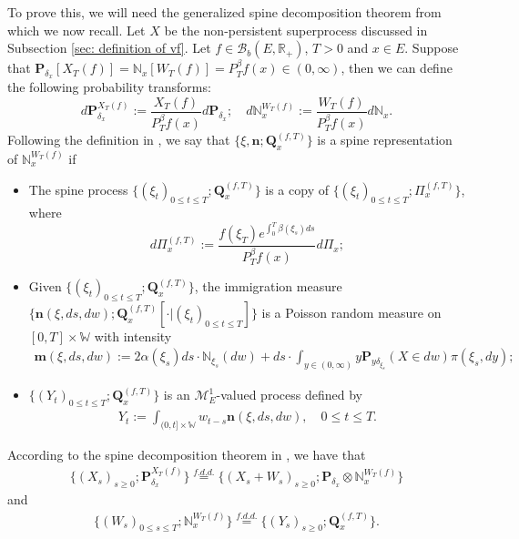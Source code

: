 \documentclass[12pt]{amsart}
\theoremstyle{plain}
\theoremstyle{definition}
\numberwithin{equation}{section}
\begin{document}
    To prove this, we will need the generalized spine decomposition theorem from \cite{RenSongSun2017Spine} which we now recall.
    Let $X$ be the non-persistent superprocess discussed in Subsection \ref{sec: definition of vf}.
    Let $f\in \mathcal B_b(E,\mathbb R_+)$, $T >0$ and $x\in E$.
    Suppose that $\mathbf P_{\delta_x}[X_T(f)] = \mathbb N_x[W_T(f)] = P^\beta_T f(x) \in (0,\infty)$, then we can define the following probability transforms:
\begin{equation}
    d\mathbf P_{\delta_x}^{X_T(f)}
    := \frac{X_T(f)}{P_T^\beta f(x)} d\mathbf P_{\delta_x};
    \quad d\mathbb N_x^{W_T(f)}
    :=  \frac{W_T(f)}{P_T^\beta f(x)} d\mathbb N_x.
\end{equation}
    Following the definition in \cite{RenSongSun2017Spine}, we say that $\{\xi, \mathbf n;\mathbf Q_{x}^{(f,T)}\}$ is a spine representation of $\mathbb N_x^{W_T(f)}$ if
\begin{itemize}
\item
    The spine process $\{(\xi_t)_{0\leq t\leq T}; \mathbf Q^{(f,T)}_x\}$ is a copy of $\{(\xi_t)_{0\leq t\leq T}; \Pi^{(f,T)}_{x}\}$,
    where
\begin{equation}
    d\Pi_x^{(f,T)} := \frac{f(\xi_T)e^{\int_0^T \beta(\xi_s)ds}}{P^\beta_T f(x)} d \Pi_x;
\end{equation}
\item
    Given $\{(\xi_t)_{0\leq t\leq T}; \mathbf Q^{(f,T)}_x\}$, the immigration measure $\{\mathbf n(\xi,ds,dw); \mathbf Q^{(f,T)}_x[\cdot |(\xi_t)_{0\leq t\leq T}]\}$ is a Poisson random measure on $[0,T] \times \mathbb W$ with intensity
\begin{align}
\label{eq: conditional intensity}
    \mathbf m(\xi,ds,dw)
    := 2 \alpha(\xi_s) ds \cdot \mathbb N_{\xi_s}(dw) + ds \cdot \int_{y\in (0,\infty)} y \mathbf P_{y\delta_{\xi_s}}(X\in dw) \pi(\xi_s,dy);
\end{align}
\item
    $\{(Y_t)_{0\leq t\leq T}; \mathbf Q^{(f,T)}_x\}$ is an $\mathcal M^1_E$-valued process defined by
\begin{align}
    Y_t
    := \int_{(0,t] \times \mathbb W} w_{t-s} \mathbf n(\xi,ds,dw),
    \quad 0 \leq t\leq T.
\end{align}
\end{itemize}
    According to the spine decomposition theorem in \cite{RenSongSun2017Spine}, we have that
\begin{align}
\label{eq: Spine decomposition 1}
    \{(X_s)_{s \geq 0};\mathbf P_{\delta_x}^{X_T(f)}\}
    \overset{f.d.d.}{=} \{(X_s + W_s)_{s \geq 0};\mathbf P_{\delta_x} \otimes \mathbb N_x^{W_T(f)} \}
\end{align}
    and
\begin{align}
\label{eq: Spine decomposition 2}
    \{(W_s)_{0\leq s\leq T};\mathbb N_x^{W_T(f)}\}
    \overset{f.d.d.}{=} \{(Y_s)_{s \geq 0};\mathbf Q_x^{(f,T)}\}.
\end{align}
\end{document}
